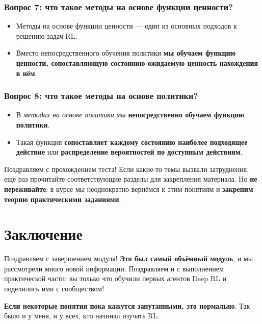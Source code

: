 \documentclass[11pt,a4paper]{article}
\begin{document}

\subsubsection{Вопрос 7: что такое методы на основе функции ценности?}\label{q7-what-are-value-based-methods-1}

\begin{itemize}
\tightlist
\item
  Методы на основе функции ценности --- один из основных подходов к решению задач RL.
\item
  Вместо непосредственного обучения политики \textbf{мы обучаем функцию ценности, сопоставляющую состоянию ожидаемую ценность нахождения в нём}.
\end{itemize}

\subsubsection{Вопрос 8: что такое методы на основе политики?}\label{q8-what-are-policy-based-methods-1}

\begin{itemize}
\tightlist
\item
  В \emph{методах на основе политики} мы \textbf{непосредственно обучаем функцию политики}.
\item
  Такая функция \textbf{сопоставляет каждому состоянию наиболее подходящее действие} или \textbf{распределение вероятностей по доступным действиям}.
\end{itemize}

Поздравляем с прохождением теста! Если какие-то темы вызвали затруднения, ещё раз прочитайте соответствующие разделы для закрепления материала. Но \textbf{не переживайте}: в курсе мы неоднократно вернёмся к этим понятиям и \textbf{закрепим теорию практическими заданиями}.

\section{Заключение}\label{conclusion}

Поздравляем с завершением модуля! \textbf{Это был самый объёмный модуль}, и мы рассмотрели много новой информации. Поздравляем и с выполнением практической части: вы только что обучили первых агентов Deep RL и поделились ими с сообществом!

\textbf{Если некоторые понятия пока кажутся запутанными, это нормально}. Так было и у меня, и у всех, кто начинал изучать RL.
\end{document}
